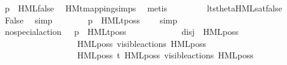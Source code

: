 \begin{isabellebody}
\ {\isacartoucheopen}{\isasymtheta}{\isacharparenleft}{\kern0pt}p{\isacharparenright}{\kern0pt}\ {\isasymTurnstile}\ HML{\isacharunderscore}{\kern0pt}false{\isacartoucheclose}\ \isamarkupfalse%
\ HMt{\isacharunderscore}{\kern0pt}mapping{\isachardot}{\kern0pt}simps{\isacharparenleft}{\kern0pt}{}{\isacharparenright}{\kern0pt}\ \isamarkupfalse%
\ metis\ \isanewline
\ \ \ \ \ \ \isamarkupfalse%
\ lts{\isacharunderscore}{\kern0pt}theta{\isachardot}{\kern0pt}HML{\isacharunderscore}{\kern0pt}sat{\isacharunderscore}{\kern0pt}false\ \isamarkupfalse%
\ False\ \isamarkupfalse%
\ simp\isanewline
\ \ \ \ \ \ \isamarkupfalse%
\ {\isacartoucheopen}p\ {\isasymTTurnstile}\ HMLt{\isacharunderscore}{\kern0pt}poss\ {\isasymalpha}\ {\isasymphi}{\isacartoucheclose}\ \isamarkupfalse%
\ simp\isanewline
\ \ \ \ \isamarkupfalse%
\isanewline
\ \ \ \ \isamarkupfalse%
\ \isamarkupfalse%
\ {\isacartoucheopen}no{\isacharunderscore}{\kern0pt}special{\isacharunderscore}{\kern0pt}action\ {\isasymalpha}\ {\isasymLongrightarrow}\ p\ {\isasymTTurnstile}\ HMLt{\isacharunderscore}{\kern0pt}poss\ {\isasymalpha}\ {\isasymphi}{\isacartoucheclose}\ \isamarkupfalse%
\ {\isacharminus}{\kern0pt}\isanewline
\ \ \ \ \ \ \isamarkupfalse%
\ {\isacharquery}{\kern0pt}disj\ {\isacharequal}{\kern0pt}\ {\isacartoucheopen}{\isacharbraceleft}{\kern0pt}HML{\isacharunderscore}{\kern0pt}poss\ {\isasymalpha}\ {\isasymsigma}{\isacharparenleft}{\kern0pt}{\isasymphi}{\isacharparenright}{\kern0pt}{\isacharcomma}{\kern0pt}\ \isanewline
\ \ \ \ \ \ \ \ \ \ \ \ \ \ \ \ \ \ HML{\isacharunderscore}{\kern0pt}poss\ {\isacharparenleft}{\kern0pt}{\isasymepsilon}{\isacharbrackleft}{\kern0pt}visible{\isacharunderscore}{\kern0pt}actions{\isacharbrackright}{\kern0pt}{\isacharparenright}{\kern0pt}\ {\isacharparenleft}{\kern0pt}HML{\isacharunderscore}{\kern0pt}poss\ {\isasymalpha}\ {\isasymsigma}{\isacharparenleft}{\kern0pt}{\isasymphi}{\isacharparenright}{\kern0pt}{\isacharparenright}{\kern0pt}{\isacharcomma}{\kern0pt}\isanewline
\ \ \ \ \ \ \ \ \ \ \ \ \ \ \ \ \ \ HML{\isacharunderscore}{\kern0pt}poss\ t{\isacharunderscore}{\kern0pt}{\isasymepsilon}\ {\isacharparenleft}{\kern0pt}HML{\isacharunderscore}{\kern0pt}poss\ {\isacharparenleft}{\kern0pt}{\isasymepsilon}{\isacharbrackleft}{\kern0pt}visible{\isacharunderscore}{\kern0pt}actions{\isacharbrackright}{\kern0pt}{\isacharparenright}{\kern0pt}\ {\isacharparenleft}{\kern0pt}HML{\isacharunderscore}{\kern0pt}poss\ {\isasymalpha}\ {\isasymsigma}{\isacharparenleft}{\kern0pt}{\isasymphi}{\isacharparenright}{\kern0pt}{\isacharparenright}{\kern0pt}{\isacharparenright}{\kern0pt}{\isacharbraceright}{\kern0pt}{\isacartoucheclose}\isanewline

\end{isabellebody}
